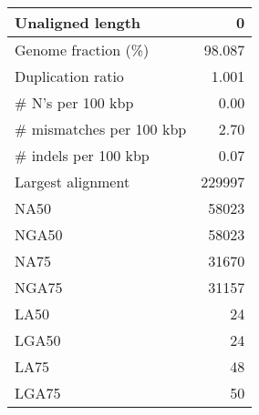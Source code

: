 \documentclass[12pt,a4paper]{article}
\begin{document}
\begin{table}[ht]
\begin{center}
\begin{tabular}{|l*{1}{|r}|}
Unaligned length & 0 \\ \hline
Genome fraction (\%) & 98.087 \\ \hline
Duplication ratio & 1.001 \\ \hline
\# N's per 100 kbp & 0.00 \\ \hline
\# mismatches per 100 kbp & 2.70 \\ \hline
\# indels per 100 kbp & 0.07 \\ \hline
Largest alignment & 229997 \\ \hline
NA50 & 58023 \\ \hline
NGA50 & 58023 \\ \hline
NA75 & 31670 \\ \hline
NGA75 & 31157 \\ \hline
LA50 & 24 \\ \hline
LGA50 & 24 \\ \hline
LA75 & 48 \\ \hline
LGA75 & 50 \\ \hline
\end{tabular}
\end{center}
\end{table}
\end{document}
